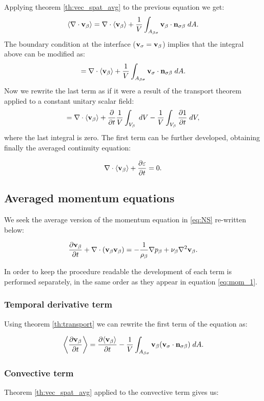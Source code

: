 \noindent Applying theorem \eqref{th:vec_spat_avg} to the previous equation we get:
$$
{\left< \nabla \cdot \textbf{v}_{\beta} \right>} = \nabla \cdot {\left< \textbf{v}_{\beta}\right>} + \dfrac{1}{V} \int_{A_{\beta \sigma}}  \textbf{v}_{\beta} \cdot \mathbf{n}_{\sigma \beta} \;dA.
$$
The boundary condition at the interface ($\textbf{v}_{\sigma} = \textbf{v}_{\beta}$) implies that the integral above can be modified as: 
$$=\nabla \cdot {\left< \textbf{v}_{\beta}\right>} + \dfrac{1}{V} \int_{A_{\beta \sigma}}  \textbf{v}_{\sigma} \cdot \mathbf{n}_{\sigma \beta} \;dA. $$
Now we rewrite the last term as if it were a result of the transport theorem applied to a constant unitary scalar field:
$$=\nabla \cdot {\left< \textbf{v}_{\beta}\right>} + \dfrac{\partial }{\partial t} \dfrac{1}{V} \int_{V_\beta} \;dV  - \dfrac{1}{V} \int_{V_\beta} \dfrac{\partial 1}{\partial t} \;dV, $$
where the last integral is zero. The first term can be further developed, obtaining finally the averaged continuity equation:

\begin{equation}
\nabla \cdot {\left< \textbf{v}_{\beta}\right>} + \dfrac{\partial \varepsilon}{\partial t} =0.
\label{eq:avg_1}
\end{equation}


\subsection{Averaged momentum equations}
We seek the average version of the momentum equation in \eqref{eq:NS} re-written below:

\begin{equation}
\dfrac{\partial \textbf{v}_{\beta}}{\partial t} + \nabla \cdot (\textbf{v}_{\beta}\textbf{v}_{\beta}) = -\frac{1}{\rho_{\beta}} \nabla p_{\beta} + \nu_{\beta} \nabla^2  \textbf{v}_{\beta}.
\label{eq:mom_1}
\end{equation}

In order to keep the procedure readable the development of each term is performed separately, in the same order as they appear in equation \eqref{eq:mom_1}.

\subsubsection{Temporal derivative term}
Using theorem \eqref{th:transport} we can rewrite the first term of the equation as:

\begin{equation}
{\left< \dfrac{\partial \textbf{v}_{\beta}}{\partial t} \right>} = \dfrac{\partial {\left< \textbf{v}_{\beta}\right>}}{\partial t} -\dfrac{1}{V} \int_{A_{\beta \sigma}}  \textbf{v}_{\beta} (\textbf{v}_{\sigma} \cdot \mathbf{n}_{\sigma \beta} )\;dA.
\end{equation}

\subsubsection{Convective term}
Theorem \eqref{th:vec_spat_avg} applied to the convective term gives us:


